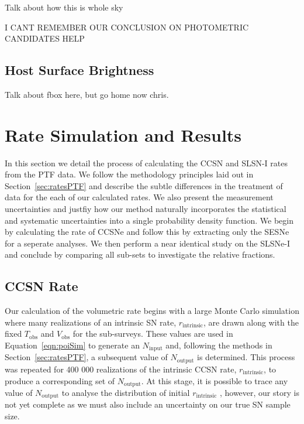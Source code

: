 \documentclass[a4paper,fleqn,usenatbib]{mnras}
\newcommand{\chris}[1]{\color{orange}#1\color{black}}
\begin{document}
Talk about how this is whole sky

\chris{I CANT REMEMBER OUR CONCLUSION ON PHOTOMETRIC CANDIDATES HELP}

\subsection{Host Surface Brightness}
\label{sec:fox_distribution}

Talk about fbox here, but go home now chris.


\section{Rate Simulation and Results}
\label{sec:rate_sim}

In this section we detail the process of calculating the CCSN and SLSN-I rates from the PTF data. We follow the methodology principles laid out in Section~\ref{sec:ratesPTF} and describe the subtle differences in the treatment of data for the each of our calculated rates. We also present the measurement uncertainties and justfiy how our method naturally incorporates the statistical and systematic uncertainties into a single probability density function. We begin by calculating the rate of CCSNe and follow this by extracting only the SESNe for a seperate analyses. We then perform a near identical study on the SLSNe-I and conclude by comparing all sub-sets to investigate the relative fractions.

\subsection{CCSN Rate}

Our calculation of the volumetric rate begins with a large Monte Carlo simulation where many realizations of an intrinsic SN rate, $r_\mathrm{intrinsic}$, are drawn along with the fixed $T_\mathrm{obs}$ and $V_\mathrm{obs}$ for the sub-surveys. These values are used in Equation~\ref{eqn:poiSim} to generate an $N_\mathrm{input}$ and, following the methods in Section~\ref{sec:ratesPTF}, a subsequent value of $N_\mathrm{output}$ is determined. This process was repeated for 400 000 realizations of the intrinsic CCSN rate, $r_\mathrm{intrinsic}$, to produce a corresponding set of $N_\mathrm{output}$. At this stage, it is possible to trace any value of $N_\mathrm{output}$ to analyse the distribution of initial $r_\mathrm{intrinsic}$ \citep[e.g.][]{Prajs2016}, however, our story is not yet complete as we must also include an uncertainty on our true SN sample size.
\end{document}
